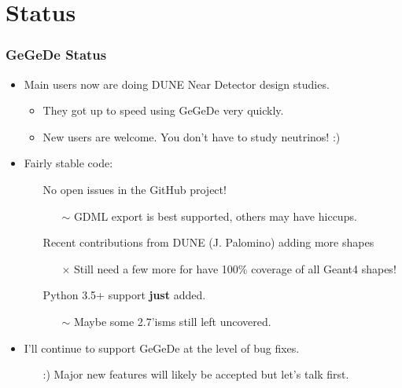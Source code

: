 \documentclass[10pt,xcolor=dvipsnames]{beamer}
\begin{document}
\section{Status}

\begin{frame}
\end{frame}


\begin{frame}
  \frametitle{GeGeDe Status}
  \begin{itemize}
  \item Main users now are doing DUNE Near Detector design studies.
    \begin{itemize}\footnotesize
    \item They got up to speed using GeGeDe very quickly.
    \item New users are welcome.  You don't have to study neutrinos! :)
    \end{itemize}
  \item Fairly stable code:
    \begin{itemize}\footnotesize
    \item[\checkmark] No open issues in the GitHub project!
      \begin{itemize}\scriptsize
      \item[$\sim$] GDML export is best supported, others may have hiccups.
      \end{itemize}
    \item[\checkmark] Recent contributions from DUNE (J. Palomino) adding more shapes
      \begin{itemize}\scriptsize
      \item[$\times$] Still need a few more for have 100\% coverage of all Geant4 shapes!
      \end{itemize}
    \item[\checkmark] Python 3.5+ support \textbf{just} added.
      \begin{itemize}\scriptsize
      \item[$\sim$] Maybe some 2.7'isms still left uncovered.
      \end{itemize}
    \end{itemize}
  \item I'll continue to support GeGeDe at the level of bug fixes.
    \begin{itemize}\footnotesize
    \item[:)] Major new features will likely be accepted but let's
      talk first.
    \end{itemize}
  \end{itemize}

\end{frame}
\end{document}
